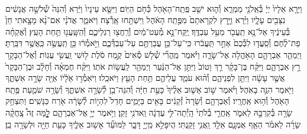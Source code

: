\documentclass[twoside, openany, parskip=half, 11pt]{book}
\begin{document}
\begin{footnotesize}
\begin{multicols}{2}
\\
וַיֵּרָ֤א אֵלָיו֙ יְיָ֔ בְּ֯אֵֽלֹנֵ֖י מַמְרֵ֑א וְ֯ה֛וּא יֹשֵׁ֥ב פֶּֽתַֽח־הָאֹ֖הֶל כְּ֯חֹ֥ם הַיּֽוֹם׃ וַיִּשָּׂ֤א עֵינָיו֙ וַיַּ֔רְא וְ֯הִנֵּה֙ שְׁ֯לֹשָׁ֣ה אֲנָשִׁ֔ים נִצָּבִ֖ים עָלָ֑יו וַיַּ֗רְא וַיָּ֤רָץ לִקְרָאתָם֙ מִפֶּ֣תַֽח הָאֹ֔הֶל וַיִּשְׁתַּ֖חוּ אָֽרְ֯צָה׃ וַיֹּאמַ֑ר אֲדֹנָ֗י אִם־נָ֨א מָצָ֤אתִי חֵן֙ בְּ֯עֵינֶ֔יךָ אַל־נָ֥א תַֽעֲבֹ֖ר מֵעַ֥ל עַבְדֶּֽךָ׃
יֻֽקַּח־נָ֣א מְ֯עַט־מַ֔יִם וְ֯רַֽחֲצ֖וּ רַגְלֵיכֶ֑ם וְ֯הִֽשָּֽׁעֲנ֖וּ תַּ֥חַת הָעֵֽץ׃ וְ֯אֶקְחָ֨ה פַת־לֶ֜חֶם וְ֯סַֽעֲד֤וּ לִבְּ֯כֶם֙ אַחַ֣ר תַּֽעֲבֹ֔רוּ כִּֽי־עַל־כֵּ֥ן עֲבַרְתֶּ֖ם עַל־עַבְדְּ֯כֶ֑ם וַיֹּ֣אמְ֯ר֔וּ כֵּ֥ן תַּֽעֲשֶׂ֖ה כַּֽאֲשֶׁ֥ר דִּבַּֽרְתָּ׃
וַיְמַהֵ֧ר אַבְרָהָ֛ם הָאֹ֖הֱלָה אֶל־שָׂרָ֑ה וַיֹּ֗אמֶר מַֽהֲרִ֞י שְׁ֯לֹ֤שׁ סְ֯אִים֙ קֶ֣מַח סֹ֔לֶת ל֖וּשִׁי וַֽעֲשִׂ֥י עֻגֽוֹת׃ וְ֯אֶל־הַבָּקָ֖ר רָ֣ץ אַבְרָהָ֑ם וַיִּקַּ֨ח בֶּן־בָּקָ֜ר רַ֤ךְ וָטוֹב֙ וַיִּתֵּ֣ן אֶל־הַנַּ֔עַר וַיְמַהֵ֖ר לַֽעֲשׂ֥וֹת אֹתֽוֹ׃ וַיִּקַּ֨ח חֶמְאָ֜ה וְ֯חָלָ֗ב וּבֶן־הַבָּקָר֙ אֲשֶׁ֣ר עָשָׂ֔ה וַיִּתֵּ֖ן לִפְנֵיהֶ֑ם וְ֯ה֨וּא עֹמֵ֧ד עֲלֵיהֶ֛ם תַּ֥חַת הָעֵ֖ץ וַיֹּאכֵֽלוּ׃  וַיֹּאֽמְ֯ר֣וּ אֵֹלָ֔יֹוֹ אַיֵּ֖ה שָׂרָ֣ה אִשְׁתֶּ֑ךָ וַיֹּ֖אמֶר הִנֵּ֥ה בָאֹֽהֶל׃ וַיֹּ֗אמֶר שׁ֣וֹב אָשׁ֤וּב אֵלֶ֨יךָ֙ כָּעֵ֣ת חַיָּ֔ה וְ֯הִנֵּה־בֵ֖ן לְ֯שָׂרָ֣ה אִשְׁתֶּ֑ךָ וְ֯שָׂרָ֥ה שֹׁמַ֛עַת פֶּ֥תַֽח הָאֹ֖הֶל וְ֯ה֥וּא אַֽחֲרָֽיו׃ וְ֯אַבְרָהָ֤ם וְ֯שָׂרָה֙ זְ֯קֵנִ֔ים בָּאִ֖ים בַּיָּמִ֑ים חָדַל֙ לִהְי֣וֹת לְ֯שָׂרָ֔ה אֹ֖רַח כַּנָּשִֽׁים׃ וַתִּצְחַ֥ק שָׂרָ֖ה בְּ֯קִרְבָּ֣הּ לֵאמֹ֑ר אַֽחֲרֵ֤י בְ֯לֹתִי֙ הָֽיְ֯תָה־לִּ֣י עֶדְנָ֔ה וַֽאדֹנִ֖י זָקֵֽן׃ וַיֹּ֥אמֶר יְיָ֖ אֶל־אַבְרָהָ֑ם לׇׇׇׇׇׇ֣מָּה זֶּה֩ צָֽחֲקָ֨ה שָׂרָ֜ה לֵאמֹ֗ר הַאַ֥ף אֻמְנָ֛ם אֵלֵ֖ד וַֽאֲנִ֥י זָקַֽנְתִּי׃ הֲיִפָּלֵ֥א מֵֽיְיָ֖ דָּבָ֑ר לַמּוֹעֵ֞ד אָשׁ֥וּב אֵלֶ֛יךָ כָּעֵ֥ת חַיָּ֖ה וּלְשָׂרָ֥ה בֵֽן׃


\end{multicols}
\end{footnotesize}
\end{document}
